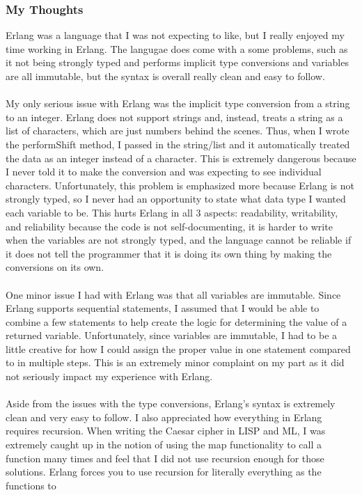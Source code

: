 \documentclass[letterpaper, 10pt, DIV=13]{scrartcl}
\numberwithin{equation}{section}
\numberwithin{figure}{section}
\numberwithin{table}{section}
\begin{document}
\subsubsection{My Thoughts}
Erlang was a language that I was not expecting to like, but I really enjoyed my time working in Erlang. The langugae does come with a some problems,
such as it not being strongly typed and performs implicit type conversions and variables are all immutable, but the syntax is overall really clean and easy to follow.
\\ \\
My only serious issue with Erlang was the implicit type conversion from a string to an integer. Erlang does not support strings and, instead, treats
a string as a list of characters, which are just numbers behind the scenes. Thus, when I wrote the performShift method, I passed in the string/list
and it automatically treated the data as an integer instead of a character. This is extremely dangerous because I never told it to make the conversion
and was expecting to see individual characters. Unfortunately, this problem is emphasized more because Erlang is not strongly typed, so I never had an
opportunity to state what data type I wanted each variable to be. This hurts Erlang in all 3 aspects: readability, writability, and reliability because
the code is not self-documenting, it is harder to write when the variables are not strongly typed, and the language cannot be reliable if it does not tell
the programmer that it is doing its own thing by making the conversions on its own.
\\ \\
One minor issue I had with Erlang was that all variables are immutable. Since Erlang supports sequential statements, I assumed that I would be able
to combine a few statements to help create the logic for determining the value of a returned variable. Unfortunately, since variables are immutable, I had to
be a little creative for how I could assign the proper value in one statement compared to in multiple steps. This is an extremely minor complaint on my
part as it did not seriously impact my experience with Erlang.
\\ \\
Aside from the issues with the type conversions, Erlang's syntax is extremely clean and very easy to follow. I also appreciated how everything in Erlang 
requires recursion. When writing the Caesar cipher in LISP and ML, I was extremely caught up in the notion of using the map functionality to call a function 
many times and feel that I did not use recursion enough for those solutions. Erlang forces you to use recursion for literally everything as the functions to
\end{document}
